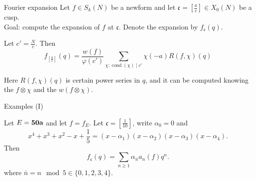 \documentclass[handout]{beamer}
\newcommand{\fc}{\mathfrak{c}}
\DeclareMathOperator{\cond}{cond}
\begin{document}
\begin{frame}{Fourier expansion}
Let $f \in S_k(N)$ be a newform and let $\fc = [\frac{a}{c}] \in X_0(N)$ be a cusp. \\


Goal: compute the expansion of $f$ at $\fc$. Denote the expansion by $f_{\fc}(q)$.  \\

\begin{theorem}[C.]
Let $c' = \frac{N}{c}$. Then 
\begin{equation*} \label{expansion0}
f_{[\frac{a}{c}]} \left( q\right) = \frac{w(f) }{\varphi(c')}\sum_{\chi: \cond(\chi) \mid c'} \chi(-a) R(f,\chi)(q)
\end{equation*}

\end{theorem}
Here $R(f, \chi)(q)$ is certain power series in $q$, and it can be computed knowing the  $f \otimes \chi$ and the  $w(f \otimes \chi)$. 



\end{frame}

\iffalse
\begin{frame}{Idea of computing}

Let $S_c' = \abcd{1}{\frac{1}{c'}}{0}{1}$ and $A_c' = \abcd{1}{0}{c'}{1}$.  Then 
\[
	A_c^{-u} = W_N S_{c'}^u W_N, \, \forall u \in \bZ. 
\]
For a character $\chi$ modulo $c'$, put 

$f|R_\chi(\cond \chi) = g(\bar{\chi})f_\chi$. ($f_\chi (q) = \sum a_n(f) \chi(n)  q^n$ is a modular form of level $N'$.)   We have \begin{equation} 
\label{formula}
	\varphi(c') A_c^{-a} = \sum_{\cond(\chi) \mid c'} \chi(a) W_N R_\chi(c') W_N. 
\end{equation}

Applying to $f$, we arrive at

\end{frame}
\fi



\begin{frame}{Examples (I)}

\begin{Example}
Let $E = {\bf 50a}$ and let $f = f_E$. Let  $\fc = [\frac{1}{10}]$, write $\alpha_0 = 0$ and 
\[
	x^4 + x^3 + x^2 - x + \frac{1}{5} = (x-\alpha_1) (x-\alpha_2)(x-\alpha_3)(x-\alpha_4).
\]
Then 
\[
	f_{\fc}(q) = \sum_{n \geq 1}  \alpha_{\bar{n}} a_n(f) q^n.
\]
where $\bar{n} = n \mod {5 } \in \{0,1,2,3,4\}$.
\end{Example}


\end{frame}
\end{document}
